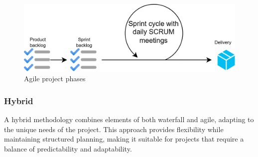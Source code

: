 \begin{figure}[H]
    \centering
    \includegraphics[width=0.5\linewidth]{images/bis9.png}
    \caption{Agile project phases}
\end{figure}

\subsubsection{Hybrid}
A hybrid methodology combines elements of both waterfall and agile, adapting to the unique needs of the project. 
This approach provides flexibility while maintaining structured planning, making it suitable for projects that require a balance of predictability and adaptability.